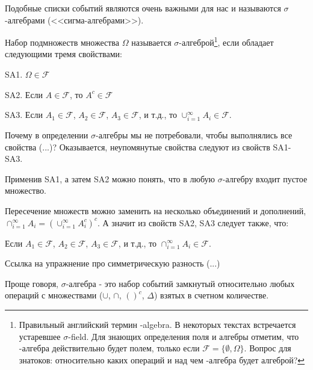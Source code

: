 {Подобные списки событий являются очень важными для нас и называются $\sigma$-алгебрами (<<сигма-алгебрами>>).

\begin{mydef} Набор подмножеств множества $\Omega$ называется $\sigma$-алгеброй\footnote{Правильный английский термин \s-algebra. В некоторых текстах встречается устаревшее $\sigma$-field. Для знающих определения поля и алгебры отметим, что \s-алгебра действительно будет полем, только если $\mathcal{F}=\{\emptyset,\Omega\}$. Вопрос для знатоков: относительно каких операций и над чем \s-алгебра будет алгеброй? }, если обладает следующими тремя свойствами:

SA1. $\Omega \in \mathcal{F}$

SA2. Если $A\in \mathcal{F}$, то $A^{c}\in \mathcal{F}$

SA3. Если $A_{1}\in\mathcal{F}$, $A_{2}\in\mathcal{F}$, $A_{3}\in\mathcal{F}$, и т.д., то $\cup_{i=1}^{\infty} A_{i} \in\mathcal{F}$.
\end{mydef}


\begin{myex}
\end{myex}

\begin{myex}
\end{myex}

Почему в определении $\sigma$-алгебры мы не потребовали, чтобы выполнялись все свойства (...)? Оказывается, неупомянутые свойства следуют из свойств SA1-SA3.

\begin{myex} Применив SA1, а затем SA2 можно понять, что в любую $\sigma$-алгебру входит пустое множество.
\end{myex}

\begin{myex} Пересечение множеств можно заменить на несколько объединений и дополнений, $\cap_{i=1}^{\infty} A_{i}=\left(\cup_{i=1}^{\infty}A_{i}^{c} \right)^{c}$. А значит из свойств SA2, SA3 следует также, что:

Если $A_{1}\in\mathcal{F}$, $A_{2}\in\mathcal{F}$, $A_{3}\in\mathcal{F}$, и т.д., то $\cap_{i=1}^{\infty} A_{i} \in\mathcal{F}$.
\end{myex}


Ссылка на упражнение про симметрическую разность (...)

Проще говоря, $\sigma$-алгебра - это набор событий замкнутый относительно любых операций с множествами ($\cup$, $\cap$, $()^{c}$, $\Delta$) взятых в счетном количестве.


}

